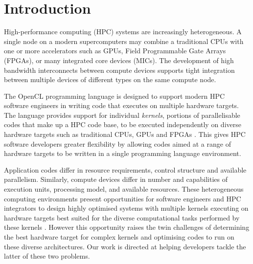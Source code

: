 \documentclass[review=false, sigchi]{acmart}
\begin{document}
	\maketitle	
	
	\section{Introduction}
	
	High-performance computing (HPC) systems are increasingly heterogeneous.
	A single node on a modern supercomputers may combine a traditional CPUs with one or more accelerators such as GPUs, Field Programmable Gate Arrays (FPGAs), or many integrated core devices (MICs).
	The development of high bandwidth interconnects between compute devices supports tight integration between multiple devices of different types on the same compute node.
	
	The OpenCL programming language is designed to support modern HPC software engineers in writing code that executes on multiple hardware targets. 
	The language provides support for individual \emph{kernels}, portions of parallelisable codes that make up a HPC code base, to be executed independently on diverse hardware targets such as traditional CPUs, GPUs and FPGAs \cite{khronosopenclworkinggroup2011opencl}. This gives HPC software developers greater flexibility by allowing codes aimed at a range of hardware targets to be written in a single programming language environment.
	
	Application codes differ in resource requirements, control structure and available parallelism. Similarly, compute devices differ in number and capabilities of execution units, processing model, and available resources. These heterogeneous computing environments present opportunities for software engineers and HPC integrators to design highly optimised systems with multiple kernels executing on hardware targets best suited for the diverse computational tasks performed by these kernels \cite{spafford2010maestro}.
	However this opportunity raises the twin challenges of determining the best hardware target for complex kernels and optimising codes to run on these diverse architectures.
	Our work is directed at helping developers tackle the latter of these two problems.
	
\end{document}
